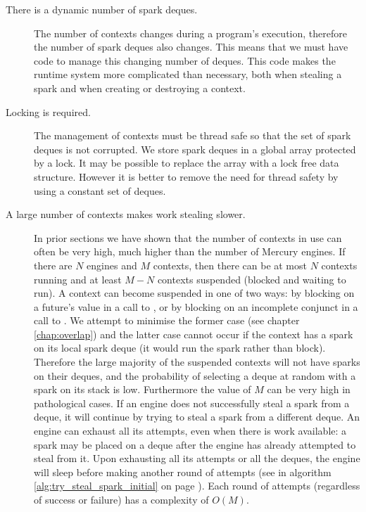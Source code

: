 \begin{description}

\item[There is a dynamic number of spark deques.]

The number of contexts changes during a program's execution,
therefore the number of spark deques also changes.
This means that we must have code to manage this changing number of
deques.
This code makes the runtime system more complicated than necessary,
both when stealing a spark and when creating or destroying a context.

\item[Locking is required.]

The management of contexts must be thread safe so that the set of
spark deques is not corrupted.
We store spark deques in a global array protected by a lock.
It may be possible to replace the array with a lock free data structure.
However it is better to remove the need for thread safety by using a
constant set of deques.

\item[A large number of contexts makes work stealing slower.]

In prior sections
we have shown that the number of contexts in use can often be very high,
much higher than the number of Mercury engines.
If there are $N$ engines and $M$ contexts,
then there can be at most $N$ contexts running and
at least $M-N$ contexts suspended (blocked and waiting to run).
A context can become suspended in one of two ways:
by blocking on a future's value in a call to \wait,
or by blocking on an incomplete conjunct in a call to \joinandcontinue.
We attempt to minimise the former case (see chapter \ref{chap:overlap})
and the latter case cannot occur
if the context has a spark on its local spark deque (it would run the
spark rather than block).
Therefore the large majority of the suspended contexts will not have
sparks on their deques,
and the probability of selecting a deque at random with a spark on its
stack is low.
Furthermore the value of $M$ can be very high in pathological cases.
If an engine does not successfully steal a spark from a deque,
it will continue by trying to steal a spark from a different deque.
An engine can exhaust all its attempts, even when there is work
available:
a spark may be placed on a deque after the engine has already attempted
to steal from it.
Upon exhausting all its attempts or all the deques,
the engine will sleep before making another round of attempts
(see \trystealspark in algorithm \ref{alg:try_steal_spark_initial} on
page \pageref{alg:try_steal_spark_initial}).
Each round of attempts (regardless of success or failure) has a
complexity of $O(M)$.

\end{description}


